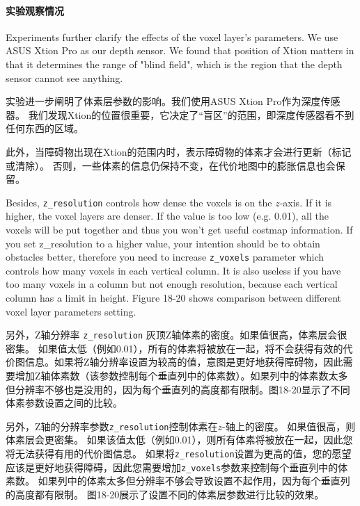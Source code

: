 \paragraph[Experiment observations]{实验观察情况}%

Experiments further clarify the effects of the voxel layer's parameters.  We use ASUS Xtion Pro as our depth sensor. We found that position of Xtion matters in that it determines the range of "blind field", which is the region that the depth sensor cannot see anything. 

实验进一步阐明了体素层参数的影响。我们使用ASUS Xtion Pro作为深度传感器。 我们发现Xtion的位置很重要，它决定了“盲区”的范围，即深度传感器看不到任何东西的区域。

此外，当障碍物出现在Xtion的范围内时，表示障碍物的体素才会进行更新（标记或清除）。
否则，一些体素的信息仍保持不变，在代价地图中的膨胀信息也会保留。

Besides, \texttt{z\_resolution} controls how dense the voxels is on the $z$-axis. If it is higher, the voxel layers are denser. If the value is too low (e.g. 0.01), all the voxels will be put together and thus you won't get useful costmap information. If you set z\_resolution to a higher value, your intention should be to obtain obstacles better, therefore you need to increase \texttt{z\_voxels} parameter which controls how many voxels in each vertical column. It is also useless if you have too many voxels in a column but not enough resolution, because each vertical column has a limit in height. Figure 18-20 shows comparison between different voxel layer parameters setting.

另外，Z轴分辨率 \texttt{z\_resolution} 灰顶Z轴体素的密度。如果值很高，体素层会很密集。
如果值太低（例如0.01），所有的体素将被放在一起，将不会获得有效的代价图信息。如果将Z轴分辨率设置为较高的值，意图是更好地获得障碍物，因此需要增加Z轴体素数（该参数控制每个垂直列中的体素数）。如果列中的体素数太多但分辨率不够也是没用的，因为每个垂直列的高度都有限制。图18-20显示了不同体素参数设置之间的比较。

另外，Z轴的分辨率参数\texttt{z\_resolution}控制体素在$ z $-轴上的密度。 如果值很高，则体素层会更密集。 
如果该值太低（例如0.01），则所有体素将被放在一起，因此您将无法获得有用的代价图信息。 
如果将\texttt{z\_resolution}设置为更高的值，您的愿望应该是更好地获得障碍，因此您需要增加\texttt{z\_voxels}参数来控制每个垂直列中的体素数。 如果列中的体素太多但分辨率不够会导致设置不起作用，因为每个垂直列的高度都有限制。 
图18-20展示了设置不同的体素层参数进行比较的效果。


